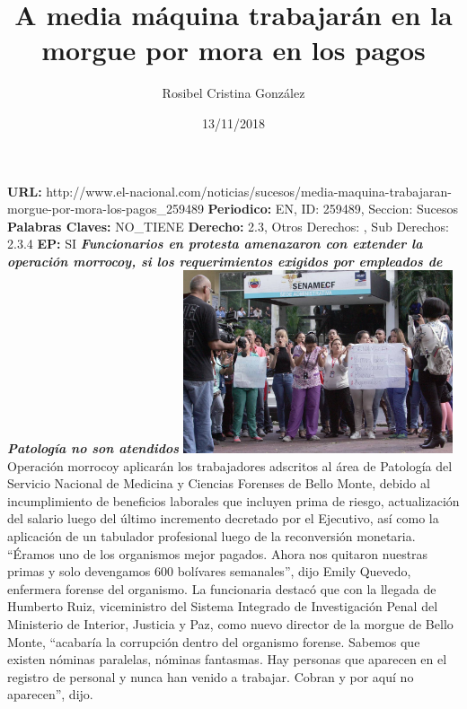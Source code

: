 \documentclass{article}%
\title{\textbf{A media máquina trabajarán en la morgue por mora en los pagos}}%
\author{Rosibel Cristina González}%
\date{13/11/2018}%
\begin{document}
%
\normalsize%
\maketitle%
\textbf{URL: }%
http://www.el{-}nacional.com/noticias/sucesos/media{-}maquina{-}trabajaran{-}morgue{-}por{-}mora{-}los{-}pagos\_259489\newline%
%
\textbf{Periodico: }%
EN, %
ID: %
259489, %
Seccion: %
Sucesos\newline%
%
\textbf{Palabras Claves: }%
NO\_TIENE\newline%
%
\textbf{Derecho: }%
2.3, %
Otros Derechos: %
, %
Sub Derechos: %
2.3.4\newline%
%
\textbf{EP: }%
SI\newline%
\newline%
%
\textbf{\textit{Funcionarios en protesta amenazaron con extender la operación morrocoy, si los requerimientos exigidos por empleados de Patología no son atendidos}}%
\newline%
\newline%
%
\includegraphics[width=300px]{119.jpg}%
\newline%
%
Operación morrocoy aplicarán los trabajadores adscritos al área de Patología del Servicio Nacional de Medicina y Ciencias Forenses de Bello Monte, debido al incumplimiento de beneficios laborales que incluyen prima de riesgo, actualización del salario luego del último incremento decretado por el Ejecutivo, así como la aplicación de un tabulador profesional luego de la reconversión monetaria. “Éramos uno de los organismos mejor pagados. Ahora nos quitaron nuestras primas y solo devengamos 600 bolívares semanales”, dijo Emily Quevedo, enfermera forense del organismo.%
\newline%
%
La funcionaria destacó que con la llegada de Humberto Ruiz, viceministro del Sistema Integrado de Investigación Penal del Ministerio de Interior, Justicia y Paz, como nuevo director de la morgue de Bello Monte, “acabaría la corrupción dentro del organismo forense. Sabemos que existen nóminas paralelas, nóminas fantasmas. Hay personas que aparecen en el registro de personal y nunca han venido a trabajar. Cobran y por aquí no aparecen”, dijo.%
\end{document}
